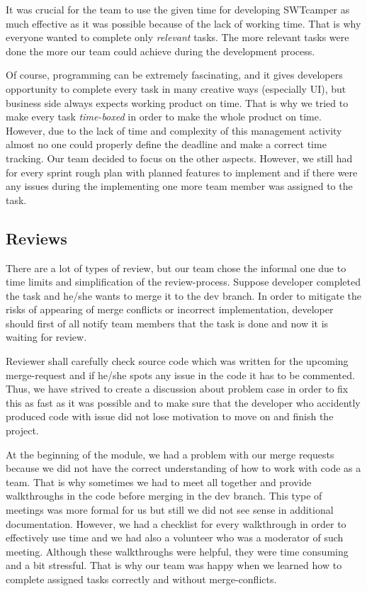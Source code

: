 It was crucial for the team to use the given time for developing SWTcamper as much effective as it was possible because of the lack of working time. That is why everyone wanted to complete only \emph{relevant} tasks. The more relevant tasks were done the more our team could achieve during the development process.

Of course, programming can be extremely fascinating, and it gives developers opportunity to complete every task in many creative ways (especially UI), but business side always expects working product on time. That is why we tried to make every task \emph{time-boxed} in order to make the whole product on time. However, due to the lack of time and complexity of this management activity almost no one could properly define the deadline and make a correct time tracking. Our team decided to focus on the other aspects. However, we still had for every sprint rough plan with planned features to implement and if there were any issues during the implementing one more team member was assigned to the task.  

\subsection{Reviews}
There are a lot of types of review, but our team chose the informal one due to time limits and simplification of the review-process. Suppose developer completed the task and he/she wants to merge it to the dev branch. In order to mitigate the risks of appearing of merge conflicts or incorrect implementation, developer should first of all notify team members that the task is done and now it is waiting for review. 

Reviewer shall carefully check source code which was written for the upcoming merge-request and if he/she spots any issue in the code it has to be commented. Thus, we have strived to create a discussion about problem case in order to fix this as fast as it was possible and to make sure that the developer who accidently produced code with issue did not lose motivation to move on and finish the project.   

At the beginning of the module, we had a problem with our merge requests because we did not have the correct understanding of how to work with code as a team. That is why sometimes we had to meet all together and provide walkthroughs in the code before merging in the dev branch. This type of meetings was more formal for us but still we did not see sense in additional documentation. However, we had a checklist for every walkthrough in order to effectively use time and we had also a volunteer who was a moderator of such meeting. Although these walkthroughs were helpful, they were time consuming and a bit stressful. That is why our team was happy when we learned how to complete assigned tasks correctly and without merge-conflicts.

